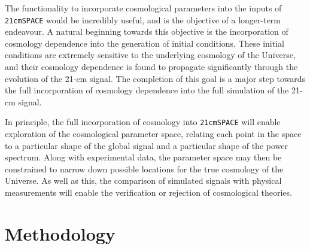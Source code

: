 \documentclass[floats,floatfix,showpacs,amssymb,prd,superscriptaddress,nofootinbib, 11pt]{revtex4-2} %
\newcommand{\code}{\texttt}
\begin{document}

The functionality to incorporate cosmological parameters into the inputs of \code{21cmSPACE} would be incredibly useful, and is the objective of a longer-term endeavour. A natural beginning towards this objective is the incorporation of cosmology dependence into the generation of initial conditions. These initial conditions are extremely sensitive to the underlying cosmology of the Universe, and their cosmology dependence is found to propagate significantly through the evolution of the 21-cm signal. The completion of this goal is a major step towards the full incorporation of cosmology dependence into the full simulation of the 21-cm signal.


In principle, the full incorporation of cosmology into \code{21cmSPACE} will enable exploration of the cosmological parameter space, relating each point in the space to a particular shape of the global signal and a particular shape of the power spectrum. Along with experimental data, the parameter space may then be constrained to narrow down possible locations for the true cosmology of the Universe. As well as this, the comparison of simulated signals with physical measurements will enable the verification or rejection of cosmological theories.




\newpage
\section{Methodology}
\end{document}

